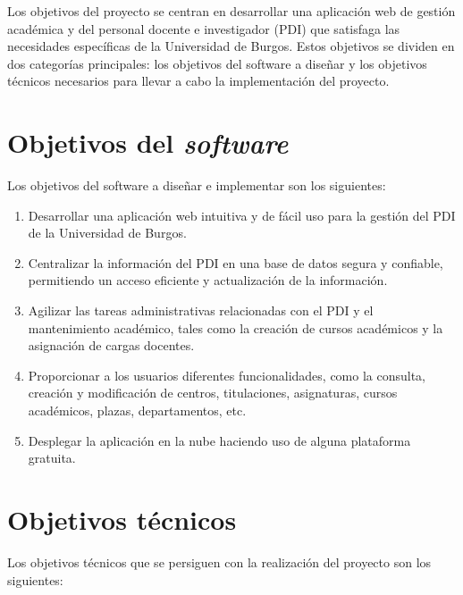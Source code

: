 
Los objetivos del proyecto se centran en desarrollar una aplicación web de gestión académica y del personal docente e investigador (PDI) que satisfaga las necesidades específicas de la Universidad de Burgos. Estos objetivos se dividen en dos categorías principales: los objetivos del software a diseñar y los objetivos técnicos necesarios para llevar a cabo la implementación del proyecto.

\section{Objetivos del \textit{software}}

Los objetivos del software a diseñar e implementar son los siguientes:

\begin{enumerate}
  \item Desarrollar una aplicación web intuitiva y de fácil uso para la gestión del PDI de la Universidad de Burgos.
  \item Centralizar la información del PDI en una base de datos segura y confiable, permitiendo un acceso eficiente y actualización de la información.
  \item Agilizar las tareas administrativas relacionadas con el PDI y el mantenimiento académico, tales como la creación de cursos académicos y la asignación de cargas docentes.
  \item Proporcionar a los usuarios diferentes funcionalidades, como la consulta, creación y modificación de centros, titulaciones, asignaturas, cursos académicos, plazas, departamentos, etc.
  \item Desplegar la aplicación en la nube haciendo uso de alguna plataforma gratuita.
\end{enumerate}

\section{Objetivos técnicos}

Los objetivos técnicos que se persiguen con la realización del proyecto son los siguientes:

